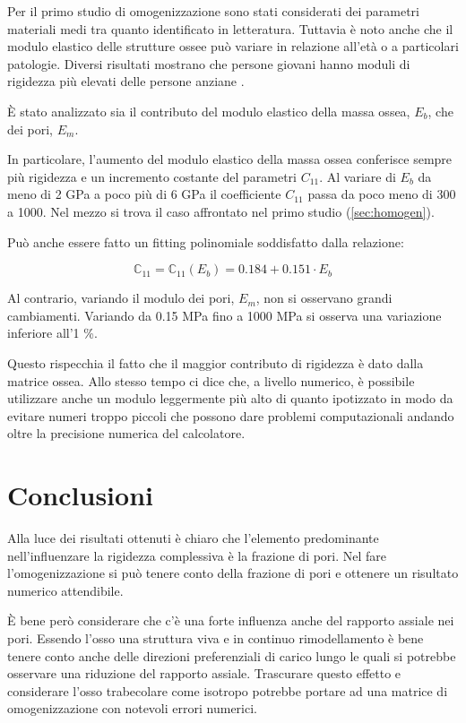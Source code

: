 \documentclass[a4paper,num-refs]{oup-contemporary}
\begin{document}
Per il primo studio di omogenizzazione sono stati considerati dei parametri materiali medi tra quanto identificato in letteratura. Tuttavia è noto anche che il modulo elastico delle strutture ossee può variare in relazione all'età o a particolari patologie. Diversi risultati mostrano che persone giovani hanno moduli di rigidezza più elevati delle persone anziane \citep{Cowin1}.

È stato analizzato sia il contributo del modulo elastico della massa ossea, $E_b$, che dei pori, $E_m$. 

In particolare, l'aumento del modulo elastico della massa ossea conferisce sempre più rigidezza e un incremento costante del parametri $C_{11}$. Al variare di $E_b$ da meno di 2 GPa a poco più di 6 GPa il coefficiente $C_{11}$ passa da poco meno di 300 a 1000. Nel mezzo si trova il caso affrontato nel primo studio (\ref{sec:homogen}).  

Può anche essere fatto un fitting polinomiale soddisfatto dalla relazione: 

\begin{equation}
	\mathbb{C}_{11}=	\mathbb{C}_{11}\left(E_b\right)=0.184 + 0.151 \cdot E_b
\end{equation}

Al contrario, variando il modulo dei pori, $E_m$, non si osservano grandi cambiamenti. Variando da 0.15 MPa fino a 1000 MPa si osserva una variazione inferiore all'1 \%. 

Questo  rispecchia il fatto che il maggior contributo di rigidezza è dato dalla matrice ossea. Allo stesso tempo ci dice che, a livello numerico, è possibile utilizzare anche un modulo leggermente più alto di quanto ipotizzato in modo da evitare numeri troppo piccoli che possono dare problemi computazionali andando oltre la precisione numerica del calcolatore. 

\section{Conclusioni}

Alla luce dei risultati ottenuti è chiaro che l'elemento predominante nell'influenzare la rigidezza complessiva è la frazione di pori. Nel fare l'omogenizzazione si può tenere conto della frazione di pori e ottenere un risultato numerico attendibile.

È bene però considerare che c'è una forte influenza anche del rapporto assiale nei pori. Essendo l'osso una struttura viva e in continuo rimodellamento è bene tenere conto anche delle direzioni preferenziali di carico lungo le quali si potrebbe osservare una riduzione del rapporto assiale. Trascurare questo effetto e considerare l'osso trabecolare come isotropo potrebbe portare ad una matrice di omogenizzazione con notevoli errori numerici. 
\end{document}
